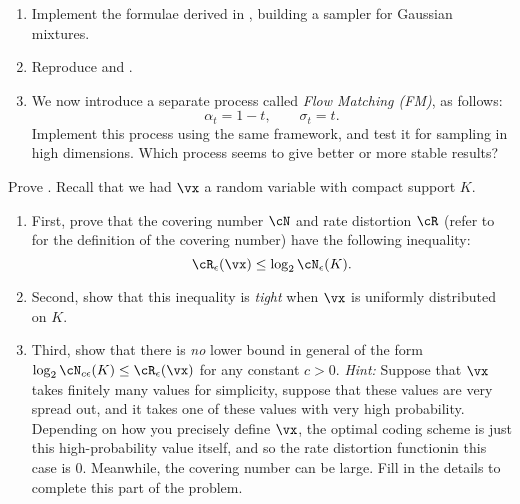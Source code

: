 \documentclass[../../book-main.tex]{subfiles}
\begin{document}
\begin{exercise}\label{exercise:implement_denoising_processes}
\begin{enumerate}
    \item Implement the formulae derived in , building a sampler for Gaussian mixtures.
    \item Reproduce  and .
    \item We now introduce a separate process called \textit{Flow Matching (FM)}, as follows:
    \begin{equation}
        \alpha_{t} = 1 - t, \qquad \sigma_{t} = t.
    \end{equation}
    Implement this process using the same framework, and test it for sampling in high dimensions. Which process seems to give better or more stable results?
\end{enumerate}
\end{exercise}

\begin{exercise}\label{exer:prop cover}
	Prove . Recall that we had \(\vx\) a random variable with compact support \(K\).
	\begin{enumerate}
		\item First, prove that the covering number \(\cN\) and rate distortion \(\cR\) (refer to  for the definition of the covering number) have the following inequality:
		\begin{equation}
			\cR_{\epsilon}(\vx) \leq \log_{2} \cN_{\epsilon}(K).
		\end{equation}
		\item Second, show that this inequality is \textit{tight} when \(\vx\) is uniformly distributed on \(K\).
		\item Third, show that there is \textit{no} lower bound in general of the form \(\log_{2} \cN_{c\epsilon}(K) \leq \cR_{\epsilon}(\vx)\) for any constant \(c > 0\). \textit{Hint:} Suppose that \(\vx\) takes finitely many values for simplicity, suppose that these values are very spread out, and it takes one of these values with very high probability. Depending on how you precisely define \(\vx\), the optimal coding scheme is just this high-probability value itself, and so the rate distortion functionin this case is \(0\). Meanwhile, the covering number can be large. Fill in the details to complete this part of the problem.
	\end{enumerate}
\end{exercise}
\end{document}

